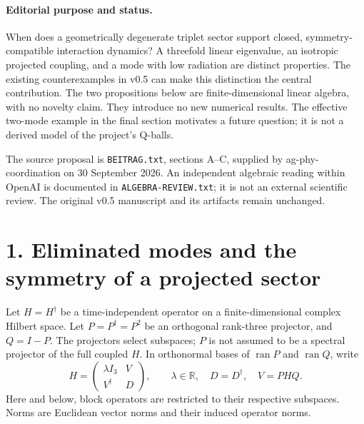\documentclass[a4paper,11pt]{article}
\newcommand{\ran}{\operatorname{ran}}
\begin{document}
\begin{flushleft}
Not incorporated into the delivered manuscript v0.5; not externally peer reviewed}
\vspace{0.7em}

{\Large\bfseries Degeneracy, invariance, and exchange: proposed additions to v0.5}
\end{flushleft}

\paragraph{Editorial purpose and status.}
When does a geometrically degenerate triplet sector support closed,
symmetry-compatible interaction dynamics?
A threefold linear eigenvalue, an isotropic projected coupling, and a mode
with low radiation are distinct properties.
The existing counterexamples in v0.5 can make this distinction the central
contribution. The two propositions below are finite-dimensional linear
algebra, with no novelty claim. They introduce no new numerical results.
The effective two-mode example in the final section motivates a future
question; it is not a derived model of the project's Q-balls.

The source proposal is \texttt{BEITRAG.txt}, sections A--C, supplied by
ag-phy-coordination on 30 September 2026. An independent algebraic reading
within OpenAI is documented in \texttt{ALGEBRA-REVIEW.txt}; it is not an
external scientific review. The original v0.5 manuscript and its artifacts
remain unchanged.

\section*{1. Eliminated modes and the symmetry of a projected sector}
Let \(H=H^\dagger\) be a time-independent operator on a finite-dimensional
complex Hilbert space. Let \(P=P^\dagger=P^2\) be an orthogonal rank-three
projector, and \(Q=I-P\). The projectors select subspaces; \(P\) is not
assumed to be a spectral projector of the full coupled \(H\).
In orthonormal bases of \(\ran P\) and \(\ran Q\), write
\begin{equation}
H=\begin{pmatrix}\lambda I_3&V\\ V^\dagger&D\end{pmatrix},
\qquad
\lambda\in\mathbb R,\quad D=D^\dagger,\quad V=PHQ.
\tag{S1}
\end{equation}
Here and below, block operators are restricted to their respective
subspaces. Norms are Euclidean vector norms and their induced operator norms.
\end{document}
